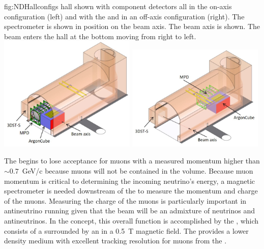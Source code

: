 \begin{dunefigure}
{fig:NDHallconfigs}
{  hall shown with component detectors all in the on-axis configuration (left) and with the  and  in an off-axis configuration (right). The  spectrometer is shown in position on the beam axis. The beam axis is shown.  The beam enters the hall at the bottom moving from right to left.}
\includegraphics[width=0.49\textwidth]{graphics/NDHall_onaxis.jpg}
\includegraphics[width=0.49\textwidth]{graphics/NDHall_offaxis.jpg}
\end{dunefigure}

The  begins to lose acceptance for muons with a measured momentum higher than $\sim0.7$~GeV/c because muons will not be contained in the  volume.  Because muon momentum is critical to determining the incoming neutrino's energy, a magnetic spectrometer is needed downstream of the  to measure the momentum and charge of the muons.  Measuring  the charge of the muons is particularly important in antineutrino running given that the beam will be an admixture of neutrinos and antineutrinos. In the   concept, this overall function is accomplished by the , which consists of a  surrounded by an  in a \SI{0.5}{T} magnetic field. The  provides a lower density medium with excellent tracking resolution for muons from the .  

